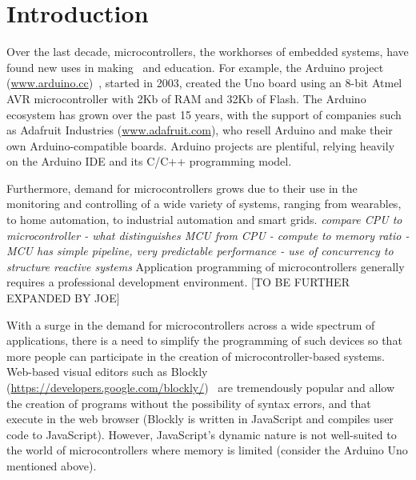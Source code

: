 \section{Introduction}
\label{sec:intro}

Over the last decade, microcontrollers, the workhorses of embedded systems, have found
new uses in making~\cite{dougherty2012maker} and education. For example, the Arduino project
(\url{www.arduino.cc})~\cite{buildingArduino2014},
started in 2003, created the Uno board using an 8-bit Atmel
AVR microcontroller with 2Kb of RAM and 32Kb of Flash.
The Arduino ecosystem has grown over the past 15 years,
with the support of companies such as Adafruit Industries (\url{www.adafruit.com}),
who resell Arduino and make their own Arduino-compatible boards. Arduino projects
are plentiful, relying heavily on the Arduino IDE and its C/C++ programming model.

Furthermore, demand for microcontrollers grows due to their use in the monitoring and controlling
of a wide variety of systems, ranging from wearables, to home automation, to industrial
automation and smart grids. \emph{compare CPU to microcontroller - what distinguishes MCU from CPU -
compute to memory ratio - MCU has simple pipeline, very predictable performance - use of concurrency
to structure reactive systems}
Application programming of microcontrollers generally requires a professional
development environment. [TO BE FURTHER EXPANDED BY JOE]

With a surge in the demand for microcontrollers across a wide
spectrum of applications, there is a need to simplify the programming
of such devices so that more people can participate in the creation
of microcontroller-based systems. Web-based visual editors such as
Blockly (\url{https://developers.google.com/blockly/})~\cite{Blocky2015}
are tremendously popular and allow the creation of programs without the
possibility of syntax errors, and that execute in the web browser (Blockly
is written in JavaScript and compiles user code to JavaScript).
However, JavaScript's dynamic nature is not well-suited to the world of
microcontrollers where memory is limited (consider the Arduino Uno mentioned above).

